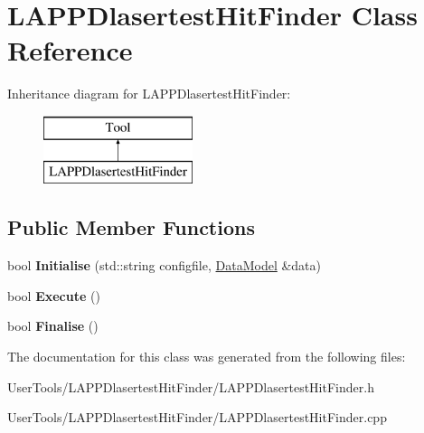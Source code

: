 \hypertarget{classLAPPDlasertestHitFinder}{\section{L\-A\-P\-P\-Dlasertest\-Hit\-Finder Class Reference}
\label{classLAPPDlasertestHitFinder}
}
Inheritance diagram for L\-A\-P\-P\-Dlasertest\-Hit\-Finder\-:\begin{figure}[H]
\begin{center}
\leavevmode
\includegraphics[height=2.000000cm]{classLAPPDlasertestHitFinder}
\end{center}
\end{figure}
\subsection*{Public Member Functions}
\begin{DoxyCompactItemize}
\item 
\hypertarget{classLAPPDlasertestHitFinder_a0a4dd1a750223833c9eb520008d4f821}{bool {\bfseries Initialise} (std\-::string configfile, \hyperlink{classDataModel}{Data\-Model} \&data)}\label{classLAPPDlasertestHitFinder_a0a4dd1a750223833c9eb520008d4f821}

\item 
\hypertarget{classLAPPDlasertestHitFinder_a028ed1741a9dd6048638a8e6f95f718a}{bool {\bfseries Execute} ()}\label{classLAPPDlasertestHitFinder_a028ed1741a9dd6048638a8e6f95f718a}

\item 
\hypertarget{classLAPPDlasertestHitFinder_a0ca3d1db237531ab1954a79f4ae469bd}{bool {\bfseries Finalise} ()}\label{classLAPPDlasertestHitFinder_a0ca3d1db237531ab1954a79f4ae469bd}

\end{DoxyCompactItemize}


The documentation for this class was generated from the following files\-:\begin{DoxyCompactItemize}
\item 
User\-Tools/\-L\-A\-P\-P\-Dlasertest\-Hit\-Finder/L\-A\-P\-P\-Dlasertest\-Hit\-Finder.\-h\item 
User\-Tools/\-L\-A\-P\-P\-Dlasertest\-Hit\-Finder/L\-A\-P\-P\-Dlasertest\-Hit\-Finder.\-cpp\end{DoxyCompactItemize}
